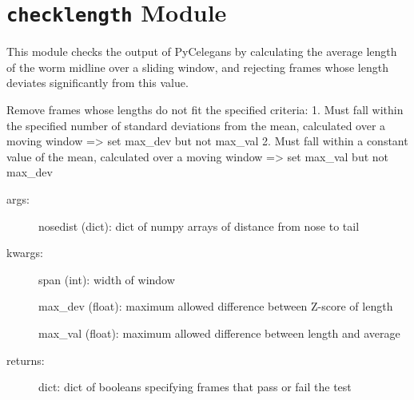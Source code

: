 \documentclass[letterpaper,10pt,openany,oneside]{sphinxmanual}
\begin{document}
\chapter{\texttt{checklength} Module}
\label{index:module-checklength}\label{index:checklength-module}
This module checks the output of PyCelegans by calculating the average length of the worm midline over a sliding window, and rejecting frames whose length deviates significantly from this value.

\begin{fulllineitems}
\label{index:checklength.checklength}
Remove frames whose lengths do not fit the specified criteria: 
1. Must fall within the specified number of standard deviations from the mean, calculated over a moving window 
=\textgreater{} set max\_dev but not max\_val
2. Must fall within a constant value of the mean, calculated over a moving window
=\textgreater{} set max\_val but not max\_dev
\begin{description}
\item[{args:}] \leavevmode
nosedist (dict): dict of numpy arrays of distance from nose to tail

\item[{kwargs:}] \leavevmode
span (int): width of window

max\_dev (float): maximum allowed difference between Z-score of length

max\_val (float): maximum allowed difference between length and average

\item[{returns:}] \leavevmode
dict: dict of booleans specifying frames that pass or fail the test

\end{description}

\end{fulllineitems}

\end{document}
